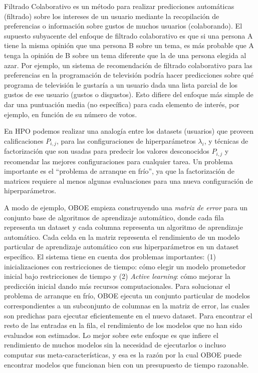 Filtrado Colaborativo es un método para realizar predicciones automáticas (filtrado) sobre los intereses de un usuario mediante la recopilación de preferencias o información sobre gustos de muchos usuarios (colaborando). El supuesto subyacente del enfoque de filtrado colaborativo es que si una persona A tiene la misma opinión que una persona B sobre un tema, es más probable que A tenga la opinión de B sobre un tema diferente que la de una persona elegida al azar. Por ejemplo, un sistema de recomendación de filtrado colaborativo para las preferencias en la programación de televisión podría hacer predicciones sobre qué programa de televisión le gustaría a un usuario dada una lista parcial de los gustos de ese usuario (gustos o disgustos). Esto difiere del enfoque más simple de dar una puntuación media (no específica) para cada elemento de interés, por ejemplo, en función de su número de votos.

En HPO podemos realizar una analogía entre los datasets (usuarios) que proveen calificaciones $P_{i,j}$, para las configuraciones de hiperparámetros $\lambda_i$, y técnicas de factorización que son usadas para predecir los valores desconocidos $P_{i,j}$ y recomendar las mejores configuraciones para cualquier tarea. Un problema importante es el ``problema de arranque en frío'', ya que la factorización de matrices requiere al menos algunas evaluaciones para una nueva configuración de hiperparámetros.

A modo de ejemplo, OBOE \cite{yang2018oboe} empieza construyendo una \textit{matriz de error} para un conjunto base de algoritmos de aprendizaje automático, donde cada fila representa un dataset y cada columna representa un algoritmo de aprendizaje automático. Cada celda en la matriz representa el rendimiento de un modelo particular de aprendizaje automático con sus hiperparámetros en un dataset específico. El sistema tiene en cuenta dos problemas importantes: (1) inicializaciones con restricciones de tiempo: cómo elegir un modelo prometedor inicial bajo restricciones de tiempo y (2) \textit{Active learning}: cómo mejorar la predicción inicial dando más recursos computacionales. Para solucionar el problema de arranque en frío, OBOE ejecuta un conjunto particular de modelos correspondientes a un subconjunto de columnas en la matriz de error, las cuales son predichas para ejecutar eficientemente en el nuevo dataset. Para encontrar el resto de las entradas en la fila, el rendimiento de los modelos que no han sido evaluados son estimados. Lo mejor sobre este enfoque es que infiere el rendimiento de muchos modelos sin la necesidad de ejecutarlos o incluso computar sus meta-características, y esa es la razón por la cual OBOE puede encontrar modelos que funcionan bien con un presupuesto de tiempo razonable.


